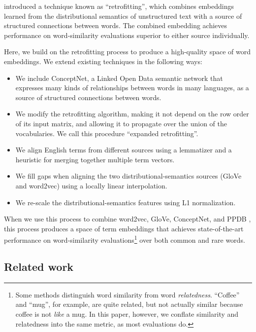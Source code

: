 \documentclass[11pt,letterpaper]{article}
\begin{document}
 introduced a technique
known as ``retrofitting'', which combines embeddings learned from the
distributional semantics of unstructured text with a source of structured
connections between words. The combined embedding achieves performance on
word-similarity evaluations superior to either source individually.

Here, we build on the retrofitting process to produce a high-quality space of
word embeddings. We extend existing techniques in the following ways:

\begin{itemize}
\item We include ConceptNet, a Linked Open Data semantic network that expresses
many kinds of relationships between words in many languages, as a source of
structured connections between words.
\item We modify the retrofitting algorithm, making it not depend on the row
order of its input matrix, and allowing it to propagate over the union of the
vocabularies. We call this procedure ``expanded retrofitting''.
\item We align English terms from different sources using a lemmatizer and a
heuristic for merging together multiple term vectors.
\item We fill gaps when aligning the two distributional-semantics sources
(GloVe and word2vec) using a locally linear interpolation.
\item We re-scale the distributional-semantics features using L1 normalization.
\end{itemize}

When we use this process to combine word2vec, GloVe, ConceptNet, and PPDB
\cite{ganitkevitch2013ppdb}, this process produces a space of term embeddings
that achieves state-of-the-art performance on word-similarity
evaluations\footnote{Some methods distinguish word similarity from word
{\em relatedness}. ``Coffee'' and ``mug'', for example, are quite related,
but not actually similar because coffee is not {\em like} a mug. In this paper,
however, we conflate similarity and relatedness into the same metric, as most
evaluations do.}
over both common and rare words.


\subsection{Related work}

\end{document}
